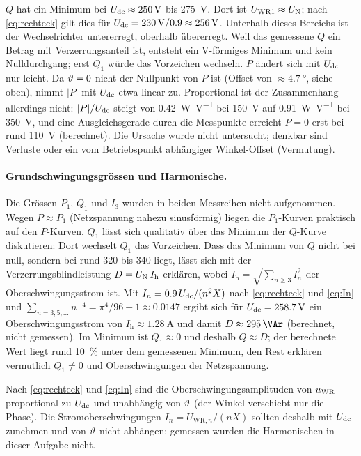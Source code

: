 $Q$ hat ein Minimum bei $U_{\mathrm{dc}}\approx\SI{250}{\volt}$ bis \SI{275}{\volt}. Dort ist $U_{\mathrm{WR1}}\approx U_{\mathrm{N}}$; nach \eqref{eq:rechteck} gilt dies für $U_{\mathrm{dc}}=\SI{230}{\volt}/0.9\approx\SI{256}{\volt}$. Unterhalb dieses Bereichs ist der Wechselrichter untererregt, oberhalb übererregt. Weil das gemessene $Q$ ein Betrag mit Verzerrungsanteil ist, entsteht ein V-förmiges Minimum und kein Nulldurchgang; erst $Q_1$ würde das Vorzeichen wechseln. $P$ ändert sich mit $U_{\mathrm{dc}}$ nur leicht. Da $\vartheta=0$ nicht der Nullpunkt von $P$ ist (Offset von $\approx\SI{4.7}{\degree}$, siehe oben), nimmt $|P|$ mit $U_{\mathrm{dc}}$ etwa linear zu. Proportional ist der Zusammenhang allerdings nicht: $|P|/U_{\mathrm{dc}}$ steigt von \SI{0.42}{\watt\per\volt} bei \SI{150}{\volt} auf \SI{0.91}{\watt\per\volt} bei \SI{350}{\volt}, und eine Ausgleichsgerade durch die Messpunkte erreicht $P=0$ erst bei rund \SI{110}{\volt} (berechnet). Die Ursache wurde nicht untersucht; denkbar sind Verluste oder ein vom Betriebspunkt abhängiger Winkel-Offset (Vermutung).

\paragraph{Grundschwingungsgrössen und Harmonische.} Die Grössen $P_1$, $Q_1$ und $I_3$ wurden in beiden Messreihen nicht aufgenommen. Wegen $P\approx P_1$ (Netzspannung nahezu sinusförmig) liegen die $P_1$-Kurven praktisch auf den $P$-Kurven. $Q_1$ lässt sich qualitativ über das Minimum der $Q$-Kurve diskutieren: Dort wechselt $Q_1$ das Vorzeichen. Dass das Minimum von $Q$ nicht bei null, sondern bei rund \SI{320}{\VAr} bis \SI{340}{\VAr} liegt, lässt sich mit der Verzerrungsblindleistung $D=U_{\mathrm{N}}\,I_{\mathrm h}$ erklären, wobei $I_{\mathrm h}=\sqrt{\sum_{n\ge3}I_n^2}$ der Oberschwingungsstrom ist. Mit $I_n=0.9\,U_{\mathrm{dc}}/(n^2X)$ nach \eqref{eq:rechteck} und \eqref{eq:In} und $\sum_{n=3,5,\dots}n^{-4}=\pi^4/96-1\approx0.0147$ ergibt sich für $U_{\mathrm{dc}}=\SI{258.7}{\volt}$ ein Oberschwingungsstrom von $I_{\mathrm h}\approx\SI{1.28}{\ampere}$ und damit $D\approx\SI{295}{\VAr}$ (berechnet, nicht gemessen). Im Minimum ist $Q_1\approx0$ und deshalb $Q\approx D$; der berechnete Wert liegt rund \SI{10}{\percent} unter dem gemessenen Minimum, den Rest erklären vermutlich $Q_1\neq0$ und Oberschwingungen der Netzspannung.

Nach \eqref{eq:rechteck} und \eqref{eq:In} sind die Oberschwingungsamplituden von $u_{\mathrm{WR}}$ proportional zu $U_{\mathrm{dc}}$ und unabhängig von $\vartheta$ (der Winkel verschiebt nur die Phase). Die Stromoberschwingungen $I_n=U_{\mathrm{WR},n}/(nX)$ sollten deshalb mit $U_{\mathrm{dc}}$ zunehmen und von $\vartheta$ nicht abhängen; gemessen wurden die Harmonischen in dieser Aufgabe nicht.

